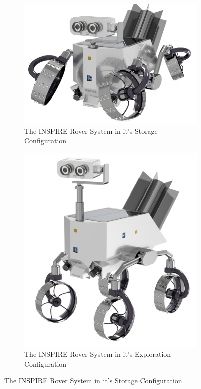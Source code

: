 \begin{figure}[htb]
     \centering
     \begin{subfigure}[b]{0.49\textwidth}
         \centering
         \includegraphics[width=\textwidth]{Media/INSPIRE Mk6_HighRes_Stowage_config}
         \caption{The INSPIRE Rover System in it's Storage Configuration}
         \label{fig:EndStorageConfig}
     \end{subfigure}
     \hfill
     \begin{subfigure}[b]{0.49\textwidth}
         \centering
         \includegraphics[width=\textwidth]{Media/INSPIRE Mk6_HighRes_Exploration}
         \caption{The INSPIRE Rover System in it's Exploration Configuration}
         \label{fig:EndExplorationConfig}
     \end{subfigure}
     \caption{The INSPIRE Rover System in it's Storage Configuration}
     \label{fig:EndConfig}
\end{figure}

\clearpage